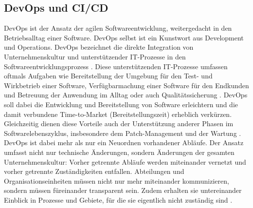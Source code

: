 \subsection{DevOps und CI/CD}
\label{DevOps und CI/CD}
\gls{DevOps} ist der Ansatz der agilen Softwareentwicklung, weitergedacht in den Betriebsalltag einer Software. \gls{DevOps} selbst ist ein Kunstwort aus \glqq{}Development\grqq{} und \glqq{}Operations\grqq{}. \gls{DevOps} bezeichnet die direkte Integration von Unternehmenskultur und unterstützender \acrshort{IT}-Prozesse in den Softwareentwicklungsprozess \cite{halstenberg_devops_2020}. Diese unterstützenden \acrshort{IT}-Prozesse umfassen oftmals Aufgaben wie Bereitstellung der Umgebung für den Test- und Wirkbetrieb einer Software, Verfügbarmachung einer Software für den Endkunden und Betreuung der Anwendung im Alltag oder auch Qualitätssicherung \cite{DevOps_Definition_AWS}. \gls{DevOps} soll dabei die Entwicklung und Bereitstellung von Software erleichtern und die damit verbundene Time-to-Market (Bereitstellungszeit) erheblich verkürzen. Gleichzeitig dienen diese Vorteile auch der Unterstützung anderer Phasen im Softwarelebenszyklus, insbesondere dem Patch-Management und der Wartung \cite{DevOps_Definition_Microsoft}.\newline
\gls{DevOps} ist dabei mehr als nur ein Neuordnen vorhandener Abläufe. Der Ansatz umfasst nicht nur technische Änderungen, sondern Änderungen der gesamten Unternehmenskultur: Vorher getrennte Abläufe werden miteinander vernetzt und vorher getrennte Zuständigkeiten entfallen. Abteilungen und Organisationseinheiten müssen nicht nur mehr miteinander kommunizieren, sondern müssen füreinander transparent sein. Zudem erhalten sie untereinander Einblick in Prozesse und Gebiete, für die sie eigentlich nicht zuständig sind \cite{DevOps_Definition_Microsoft} \cite{DevOps_Definition_AWS}.\newline
